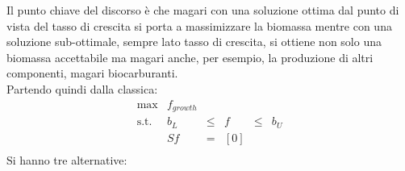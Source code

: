 \documentclass[a4paper,12pt, oneside]{book}
\begin{document}
Il punto chiave del discorso è che magari con una soluzione ottima dal punto di
vista del tasso di crescita si porta a massimizzare la biomassa mentre con una
soluzione sub-ottimale, sempre lato tasso di crescita, si ottiene non solo una
biomassa accettabile ma magari anche, per esempio, la produzione di altri
componenti, magari biocarburanti. \\
Partendo quindi dalla classica:
\begin{equation*}
  \begin{array}{rrclcl}
    \displaystyle \max & f_{growth} \\
    \textrm{s.t.} & b_L & \leq & f & \leq & b_{U} \\
                       & Sf & = & [0] \\
  \end{array}
\end{equation*}
Si hanno tre alternative:
\end{document}
